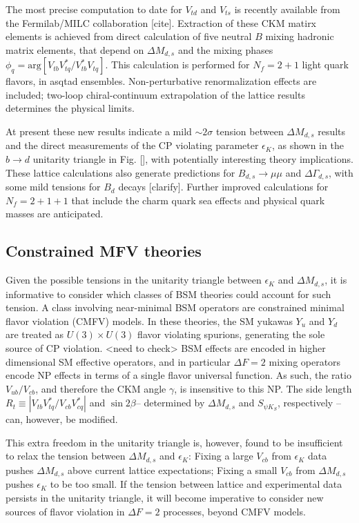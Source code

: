 The most precise computation to date for $V_{td}$ and $V_{ts}$ is recently available from the Fermilab/MILC collaboration [cite]. Extraction of these CKM matirx elements is achieved from direct calculation of five neutral $B$ mixing hadronic matrix elements, that depend on $\Delta M_{d,s}$ and the mixing phases $\phi_{q} = \text{arg}[V_{tb}V^*_{tq}/V^*_{tb}V_{tq}] $. This calculation is performed for $N_f = 2+1$ light quark flavors, in asqtad ensembles. Non-perturbative renormalization effects are included; two-loop chiral-continuum extrapolation of the lattice results determines the physical limits.

At present these new results indicate a mild $\sim 2 \sigma$ tension between $\Delta M_{d,s}$ results and the direct measurements of the CP violating parameter $\epsilon_K$, as shown  in the $b \to d$ unitarity triangle in Fig. [], with potentially interesting theory implications. These lattice calculations also generate predictions for $B_{d,s} \to \mu\mu$ and $\Delta\Gamma_{d,s}$, with some mild tensions for $B_d$ decays [clarify]. Further improved calculations for $N_f = 2 + 1 + 1$ that include the charm quark sea effects and physical quark masses are anticipated.

\subsection{Constrained MFV theories}
Given the possible tensions in the unitarity triangle between $\epsilon_K$ and $\Delta M_{d,s}$, it is informative to consider which classes of BSM theories could account for such tension. A class involving near-minimal BSM operators are constrained minimal flavor violation (CMFV) models. In these theories, the SM yukawas $Y_u$ and $Y_d$ are treated as $U(3)\times U(3)$ flavor violating spurions, generating the sole source of CP violation. <need to check>  BSM effects are encoded in higher dimensional SM effective operators, and in particular $\Delta F = 2$ mixing operators encode NP effects in terms of a single flavor universal function. As such, the ratio $V_{ub}/V_{cb}$, and therefore the CKM angle $\gamma$, is insensitive to this NP. The side length $R_t \equiv |V_{tb} V^*_{tq}/V_{cb} V^*_{cq}|$ and $\sin2\beta$-- determined by $\Delta M_{d,s}$ and $S_{\psi K_S}$, respectively -- can, however, be modified. 

This extra freedom in the unitarity triangle is, however, found to be insufficient to relax the tension between $\Delta M_{d,s}$ and $\epsilon_K$: Fixing a large $V_{cb}$ from $\epsilon_K$ data pushes $\Delta M_{d,s}$ above current lattice expectations; Fixing a small $V_{cb}$ from $\Delta M_{d,s}$ pushes $\epsilon_K$ to be too small. If the tension between lattice and experimental data persists in the unitarity triangle, it will become imperative to consider new sources of flavor violation in $\Delta F = 2$ processes, beyond CMFV models.

